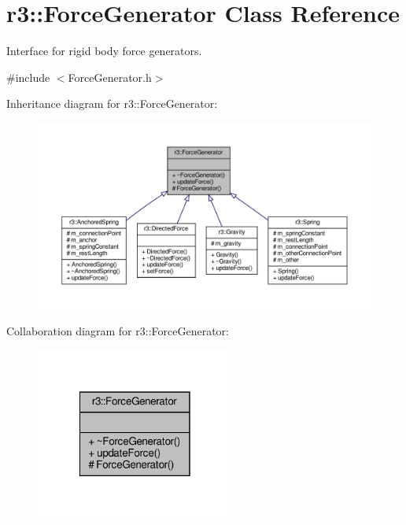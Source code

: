 \hypertarget{classr3_1_1_force_generator}{}\section{r3\+:\+:Force\+Generator Class Reference}
\label{classr3_1_1_force_generator}


Interface for rigid body force generators.  




{\ttfamily \#include $<$Force\+Generator.\+h$>$}



Inheritance diagram for r3\+:\+:Force\+Generator\+:\nopagebreak
\begin{figure}[H]
\begin{center}
\leavevmode
\includegraphics[width=350pt]{classr3_1_1_force_generator__inherit__graph}
\end{center}
\end{figure}


Collaboration diagram for r3\+:\+:Force\+Generator\+:\nopagebreak
\begin{figure}[H]
\begin{center}
\leavevmode
\includegraphics[width=185pt]{classr3_1_1_force_generator__coll__graph}
\end{center}
\end{figure}
